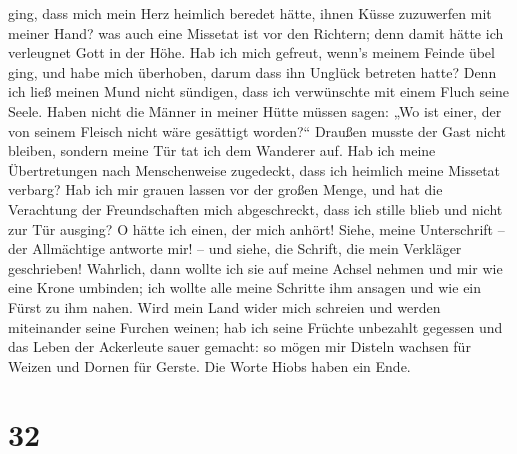 ging,  dass mich mein Herz heimlich beredet hätte, ihnen
Küsse zuzuwerfen mit meiner Hand?  was auch eine Missetat
ist vor den Richtern; denn damit hätte ich verleugnet Gott in der Höhe.
 Hab ich mich gefreut, wenn's meinem Feinde übel ging,
und habe mich überhoben, darum dass ihn Unglück betreten hatte?
 Denn ich ließ meinen Mund nicht sündigen, dass ich
verwünschte mit einem Fluch seine Seele.  Haben nicht die
Männer in meiner Hütte müssen sagen: „Wo ist einer, der von seinem
Fleisch nicht wäre gesättigt worden?{}``  Draußen musste
der Gast nicht bleiben, sondern meine Tür tat ich dem Wanderer auf.
 Hab ich meine Übertretungen nach Menschenweise
zugedeckt, dass ich heimlich meine Missetat verbarg?  Hab
ich mir grauen lassen vor der großen Menge, und hat die Verachtung der
Freundschaften mich abgeschreckt, dass ich stille blieb und nicht zur
Tür ausging?  O hätte ich einen, der mich anhört! Siehe,
meine Unterschrift -- der Allmächtige antworte mir! -- und siehe, die
Schrift, die mein Verkläger geschrieben!  Wahrlich, dann
wollte ich sie auf meine Achsel nehmen und mir wie eine Krone umbinden;
 ich wollte alle meine Schritte ihm ansagen und wie ein
Fürst zu ihm nahen.  Wird mein Land wider mich schreien
und werden miteinander seine Furchen weinen;  hab ich
seine Früchte unbezahlt gegessen und das Leben der Ackerleute sauer
gemacht:  so mögen mir Disteln wachsen für Weizen und
Dornen für Gerste. Die Worte Hiobs haben ein Ende.

\hypertarget{section-31}{%
\section{32}\label{section-31}}

